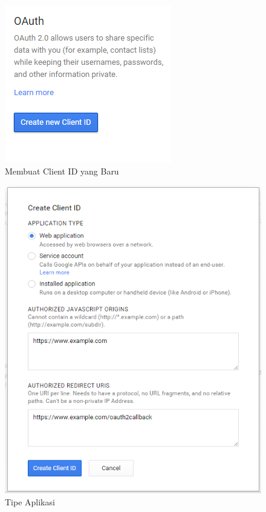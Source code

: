 \begin{figure}[H]
\centering
\includegraphics[scale=0.7]{Gambar/newclientid.png}
\caption[Membuat Client ID yang Baru]{Membuat Client ID yang Baru} 
\label{fig:newclientid}
\end{figure}

\begin{figure}[H]
\centering
\includegraphics[scale=0.7]{Gambar/tipeaplikasi.png}
\caption[Tipe Aplikasi]{Tipe Aplikasi} 
\label{fig:tipeaplikasi}
\end{figure}

